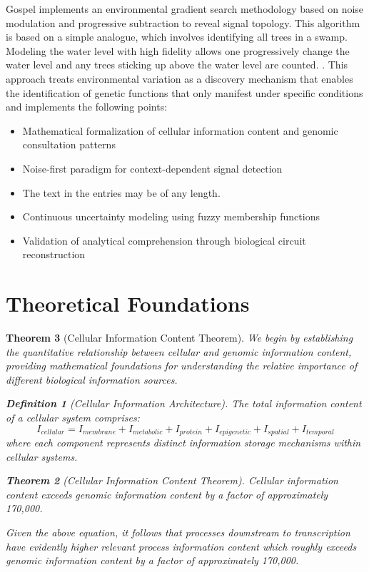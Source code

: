 \documentclass[12pt,a4paper]{article}
\newtheorem{theorem}{Theorem}[section]
\newtheorem{definition}[theorem]{Definition}
\begin{document}
Gospel implements an environmental gradient search methodology based on noise modulation and progressive subtraction to reveal signal topology. This algorithm is based on a simple analogue, which involves identifying all trees in a swamp. Modeling the water level with high fidelity allows one progressively change the water level and any trees sticking up above the water level are counted. \cite{wishart2018hmdb, smith2006xcms}. This approach treats environmental variation as a discovery mechanism that enables the identification of genetic functions that only manifest under specific conditions and implements the following points:

\begin{itemize}
  \item Mathematical formalization of cellular information content and genomic consultation patterns
  \item Noise-first paradigm for context-dependent signal detection
  \item The text in the entries may be of any length.
  \item Continuous uncertainty modeling using fuzzy membership functions
  \item Validation of analytical comprehension through biological circuit reconstruction
\end{itemize}

\section{Theoretical Foundations}
\begin{theorem}[Cellular Information Content Theorem]
We begin by establishing the quantitative relationship between cellular and genomic information content, providing mathematical foundations for understanding the relative importance of different biological information sources.

\begin{definition}[Cellular Information Architecture]
The total information content of a cellular system comprises:
\begin{equation}
I_{cellular} = I_{membrane} + I_{metabolic} + I_{protein} + I_{epigenetic} + I_{spatial} + I_{temporal}
\end{equation}
where each component represents distinct information storage mechanisms within cellular systems.
\end{definition}

\begin{theorem}[Cellular Information Content Theorem]
Cellular information content exceeds genomic information content by a factor of approximately 170,000.
\end{theorem}
Given the above equation, it follows that processes downstream to transcription have evidently higher relevant process information content which roughly exceeds genomic information content by a factor of approximately 170,000.
\end{theorem}
\end{document}
